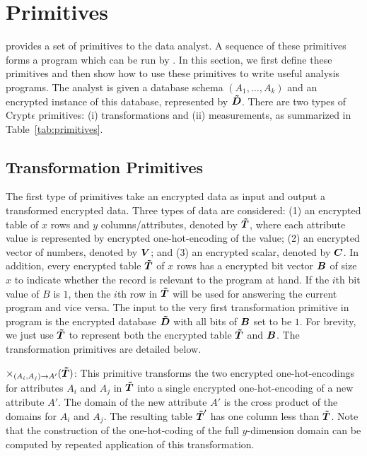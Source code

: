 
\section{\system Primitives}\label{sec:primitives}
\system provides a set of \system primitives to the data analyst.
A sequence of these primitives forms a program which can be run by \system.
In this section, we first define these primitives and then show how to use these primitives to write useful analysis programs.
The analyst is given a database schema $(A_1,\ldots,A_k)$ and an encrypted instance of this database, represented by $\boldsymbol{\tilde{D}}$.
There are two types of Crypt$\epsilon$ primitives:  (i) transformations and (ii) measurements, as summarized in Table~\ref{tab:primitives}.




\subsection{Transformation Primitives}\label{sec:transformation_primitives}
The first type of primitives take an encrypted data as input and output a transformed encrypted data. Three types of data are considered: (1) an encrypted table of $x$ rows and $y$ columns/attributes, denoted by $\boldsymbol{\tilde{T}}$, where each attribute value is represented by encrypted one-hot-encoding of the value; (2) an encrypted vector of numbers, denoted by $\boldsymbol{V}$; and (3) an encrypted scalar, denoted by $\boldsymbol{C}$. In addition, every encrypted table $\boldsymbol{\tilde{T}}$ of $x$ rows has a encrypted bit vector $\boldsymbol{B}$ of size $x$ to indicate whether the record is relevant to the program at hand. If the $i$th bit value of $B$ is $1$, then the $i$th row in $\boldsymbol{\tilde{T}}$ will be used for answering the current program and vice versa. The input to the very first transformation primitive in \system program is the encrypted database $\boldsymbol{\tilde{D}}$ with all bits of $\boldsymbol{B}$ set to be $1$. For brevity, we just use $\boldsymbol{\tilde{T}}$ to represent both the encrypted table $\boldsymbol{\tilde{T}}$ and $\boldsymbol{B}$. The transformation primitives are detailed below.

 $\times_{(A_i,A_j)\rightarrow A'}(\boldsymbol{\tilde{T}})$: This primitive transforms the two encrypted one-hot-encodings for attributes $A_i$ and $A_j$ in $\boldsymbol{\tilde{T}}$ into a single encrypted one-hot-encoding of a new attribute $A'$. The domain of the new attribute $A'$ is the cross product of the domains for $A_i$ and $A_j$. The resulting table $\boldsymbol{\tilde{T}}'$ has one column less than $\boldsymbol{\tilde{T}}$. Note that the construction of the one-hot-coding of the full $y$-dimension domain can be computed by repeated application of this transformation. 	
    

